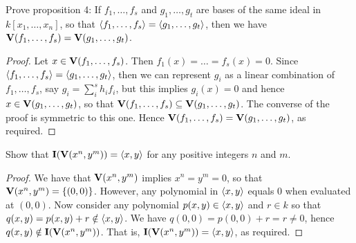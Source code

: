 \begin{exercise}{4}
Prove proposition 4: If $f_1,\dots,f_s$ and $g_1,\dots,g_t$ are bases of the same ideal in $k[x_1,\dots,x_n]$, so that $\langle f_1,\dots,f_s\rangle=\langle g_1,\dots,g_t\rangle$, then we have $\mathbf{V}(f_1,\dots,f_s)=\mathbf{V}(g_1,\dots,g_t)$.
\end{exercise}
\begin{proof}
Let $x\in \mathbf{V}(f_1,\dots,f_s)$. Then $f_1(x)=\dots=f_s(x)=0$. Since $\langle f_1,\dots,f_s\rangle=\langle g_1,\dots,g_t\rangle$, then we can represent $g_i$ as a linear combination of $f_1,\dots,f_s$, say $g_i=\sum_i^sh_if_i$, but this implies $g_i(x)=0$ and hence $x\in\mathbf{V}(g_1,\dots,g_t)$, so that $\mathbf{V}(f_1,\dots,f_s)\subseteq\mathbf{V}(g_1,\dots,g_t)$. The converse of the proof is symmetric to this one. Hence $\mathbf{V}(f_1,\dots,f_s)=\mathbf{V}(g_1,\dots,g_t)$, as required.
\end{proof}

\begin{exercise}{7}
Show that $\mathbf{I}(\mathbf{V}(x^n,y^m))=\langle x,y\rangle$ for any positive integers $n$ and $m$.
\end{exercise}
\begin{proof}
We have that $\mathbf{V}(x^n,y^m)$ implies $x^n=y^m=0$, so that $\mathbf{V}(x^n,y^m)=\{(0,0)\}$. However, any polynomial in $\langle x,y\rangle$ equals 0 when evaluated at $(0,0)$. Now consider any polynomial $p(x,y)\in\langle x,y\rangle$ and $r\in k$ so that $q(x,y)=p(x,y)+r\notin\langle x,y\rangle$. We have $q(0,0)=p(0,0)+r=r\neq 0$, hence $q(x,y)\notin\mathbf{I}(\mathbf{V}(x^n,y^m))$. That is, $\mathbf{I}(\mathbf{V}(x^n,y^m))=\langle x,y\rangle$, as required.
\end{proof}

